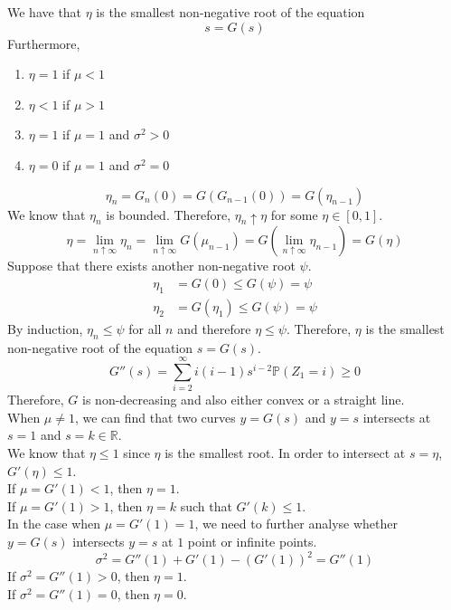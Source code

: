 \documentclass{huhtakm-template-book}
\newcommand{\prob}{\mathbb{P}}
\begin{document}
\newpage
\begin{thm}
	We have that $\eta$ is the smallest non-negative root of the equation
	\begin{equation*}
		s=G(s)
	\end{equation*}
	Furthermore,
	\begin{enumerate}
		\item $\eta=1$ if $\mu<1$
		\item $\eta<1$ if $\mu>1$
		\item $\eta=1$ if $\mu=1$ and $\sigma^{2}>0$
		\item $\eta=0$ if $\mu=1$ and $\sigma^{2}=0$
	\end{enumerate}
\end{thm}
\begin{proofing}
	\begin{equation*}
		\eta_{n}=G_{n}(0)=G(G_{n-1}(0))=G(\eta_{n-1})
	\end{equation*}
	We know that $\eta_{n}$ is bounded. Therefore, $\eta_{n}\uparrow\eta$ for some $\eta\in[0,1]$.
	\begin{equation*}
		\eta=\lim_{n\uparrow\infty}\eta_{n}=\lim_{n\uparrow\infty}G(\mu_{n-1})=G\left(\lim_{n\uparrow\infty}\eta_{n-1}\right)=G(\eta)
	\end{equation*}
	Suppose that there exists another non-negative root $\psi$.
	\begin{align*}
		\eta_{1}&=G(0)\leq G(\psi)=\psi\\
		\eta_{2}&=G(\eta_{1})\leq G(\psi)=\psi
	\end{align*}
	By induction, $\eta_{n}\leq\psi$ for all $n$ and therefore $\eta\leq\psi$. Therefore, $\eta$ is the smallest non-negative root of the equation $s=G(s)$.
	\begin{equation*}
		G''(s)=\sum_{i=2}^{\infty}i(i-1)s^{i-2}\prob(Z_{1}=i)\geq 0
	\end{equation*}
	Therefore, $G$ is non-decreasing and also either convex or a straight line.\\
	When $\mu\neq 1$, we can find that two curves $y=G(s)$ and $y=s$ intersects at $s=1$ and $s=k\in\mathbb{R}$.\\
	We know that $\eta\leq 1$ since $\eta$ is the smallest root. In order to intersect at $s=\eta$, $G'(\eta)\leq 1$.\\
	If $\mu=G'(1)<1$, then $\eta=1$.\\
	If $\mu=G'(1)>1$, then $\eta=k$ such that $G'(k)\leq 1$.\\
	In the case when $\mu=G'(1)=1$, we need to further analyse whether $y=G(s)$ intersects $y=s$ at $1$ point or infinite points.
	\begin{equation*}
		\sigma^{2}=G''(1)+G'(1)-(G'(1))^{2}=G''(1)
	\end{equation*}
	If $\sigma^{2}=G''(1)>0$, then $\eta=1$.\\
	If $\sigma^{2}=G''(1)=0$, then $\eta=0$.
\end{proofing}
\end{document}
